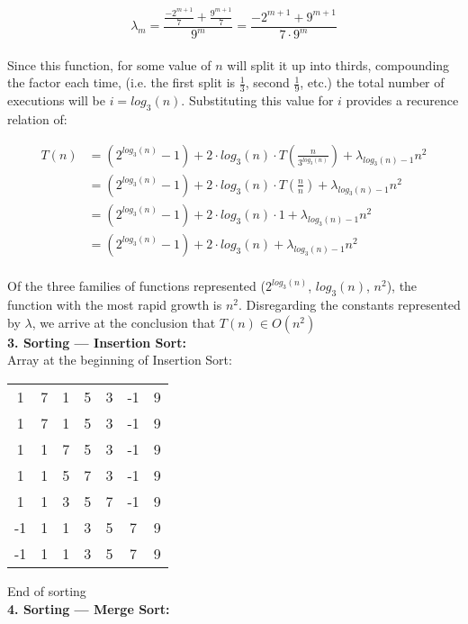 \documentclass[12pt]{article}
\begin{document}
\begin{equation}
\lambda_m = \frac{\frac{-2^{m + 1}}{7} + \frac{9^{m + 1}}{7}}{9^m} = \frac{-2^{m + 1} + 9^{m + 1}}{7 \cdot 9^m}
\end{equation} \\

Since this function, for some value of $n$ will split it up into thirds, compounding the factor each time, (i.e. the first split is $\frac{1}{3}$, second $\frac{1}{9}$, etc.) the total number of executions will be $i = log_3(n)$. Substituting this value for $i$ provides a recurence relation of:

\begin{align*}
    T(n) &= (2^{log_3(n)} - 1) + 2 \cdot log_3(n) \cdot T(\frac{n}{3^{log_3(n)}}) + \lambda_{log_3(n)-1}n^2 \\
    &= (2^{log_3(n)} - 1) + 2 \cdot log_3(n) \cdot T(\frac{n}{n}) + \lambda_{log_3(n)-1}n^2 \\
    &= (2^{log_3(n)} - 1) + 2 \cdot log_3(n) \cdot 1 + \lambda_{log_3(n)-1}n^2 \\
    &= (2^{log_3(n)} - 1) + 2 \cdot log_3(n) + \lambda_{log_3(n)-1}n^2
\end{align*} \\

Of the three families of functions represented ($2^{log_3(n)}$, $log_3(n)$, $n^2$), the function with the most rapid growth is $n^2$. Disregarding the constants represented by $\lambda$, we arrive at the conclusion that $T(n) \in O(n^2)$ \\

\textbf{3. Sorting --- Insertion Sort:}\\
Array at the beginning of Insertion Sort:
\begin{center}
\begin{tabular}{ccccccc}
1 &7 &1 &5 &3 &-1 &9 \\
1 & 7 & 1 & 5 & 3 & -1 & 9 \\
1 & 1 & 7 & 5 & 3 & -1 & 9 \\
1 & 1 & 5 & 7 & 3 & -1 & 9 \\
1 & 1 & 3 & 5 & 7 & -1 & 9 \\
-1 & 1 & 1 & 3 & 5 & 7 & 9 \\
-1 & 1 & 1 & 3 & 5 & 7 & 9
\end{tabular}{}
\end{center}
End of sorting \\

\textbf{4. Sorting --- Merge Sort:} \\
\end{document}
